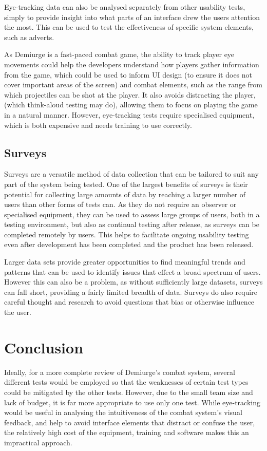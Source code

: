 \documentclass{scrartcl}
\begin{document}
Eye-tracking data can also be analysed separately from other usability tests, simply to provide insight into what parts of an interface drew the users attention the most. This can be used to test the effectiveness of specific system elements, such as adverts. 

As Demiurge is a fast-paced combat game, the ability to track player eye movements could help the developers understand how players gather information from the game, which could be used to inform UI design (to ensure it does not cover important areas of the screen) and combat elements, such as the range from which projectiles can be shot at the player. It also avoids distracting the player, (which think-aloud testing may do), allowing them to focus on playing the game in a natural manner. \cite{learningGames} However, eye-tracking tests require specialised equipment, which is both expensive and needs training to use correctly. 


\subsection{Surveys}
Surveys are a versatile method of data collection that can be tailored to suit any part of the system being tested. One of the largest benefits of surveys is their potential for collecting large amounts of data by reaching a larger number of users than other forms of tests can. \cite{conductingSurveys} As they do not require an observer or specialised equipment, they can be used to assess large groups of users, both in a testing environment, but also as continual testing after release, as surveys can be completed remotely by users. \cite{userExperience} This helps to facilitate ongoing usability testing even after development has been completed and the product has been released.

Larger data sets provide greater opportunities to find meaningful trends and patterns that can be used to identify issues that effect a broad spectrum of users. However this can also be a problem, as without sufficiently large datasets, surveys can fall short, providing a fairly limited breadth of data. Surveys do also require careful thought and research to avoid questions that bias or otherwise influence the user. \cite{dataCollection}




\section{Conclusion}
Ideally, for a more complete review of Demiurge's combat system, several different tests would be employed so that the weaknesses of certain test types could be mitigated by the other tests. However, due to the small team size and lack of budget, it is far more appropriate to use only one test. While eye-tracking would be useful in analysing the intuitiveness of the combat system's visual feedback, and help to avoid interface elements that distract or confuse the user, the relatively high cost of the equipment, training and software makes this an impractical approach. \cite{eyeTrackingBanks} \cite{neilsonQuant}
\end{document}
